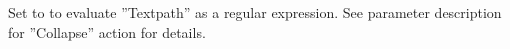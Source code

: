     Set to \gdrefbooleantrue to evaluate ''Textpath'' as a
  regular expression. See parameter description for ''Collapse''
  action for details.
